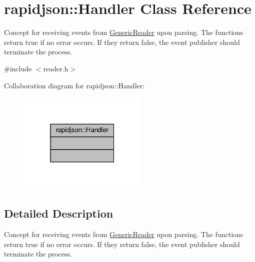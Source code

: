 \hypertarget{classrapidjson_1_1Handler}{}\section{rapidjson\+:\+:Handler Class Reference}
\label{classrapidjson_1_1Handler}


Concept for receiving events from \hyperlink{classGenericReader}{Generic\+Reader} upon parsing. The functions return true if no error occurs. If they return false, the event publisher should terminate the process.  




{\ttfamily \#include $<$reader.\+h$>$}



Collaboration diagram for rapidjson\+:\+:Handler\+:
\nopagebreak
\begin{figure}[H]
\begin{center}
\leavevmode
\includegraphics[width=175pt]{classrapidjson_1_1Handler__coll__graph}
\end{center}
\end{figure}


\subsection{Detailed Description}
Concept for receiving events from \hyperlink{classGenericReader}{Generic\+Reader} upon parsing. The functions return true if no error occurs. If they return false, the event publisher should terminate the process. 


